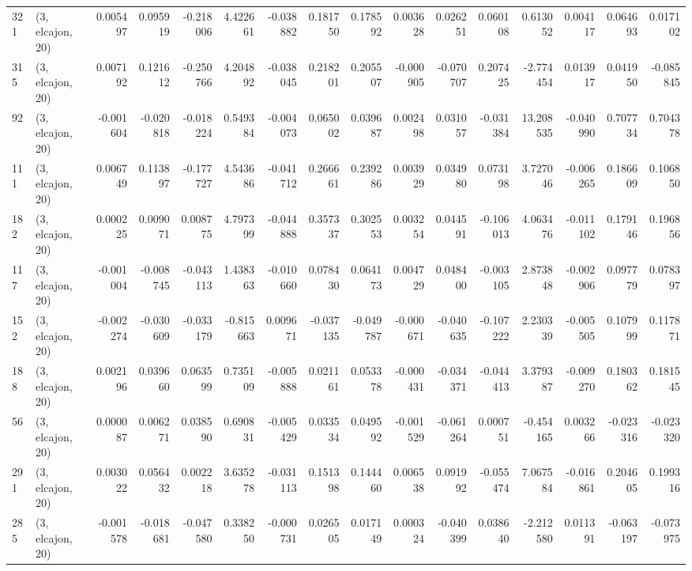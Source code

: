 \begin{tabular}{llrrrrrrrrrrrrrr}
321 &  (3, elcajon, 20) &   0.005497 &  0.095919 & -0.218006 &    4.422661 & -0.038882 &   0.181750 &  0.178592 &  0.003628 &  0.026251 &  0.060108 &    0.613052 &  0.004117 &  0.064693 &  0.017102 \\
315 &  (3, elcajon, 20) &   0.007192 &  0.121612 & -0.250766 &    4.204892 & -0.038045 &   0.218201 &  0.205507 & -0.000905 & -0.070707 &  0.207425 &   -2.774454 &  0.013917 &  0.041950 & -0.085845 \\
92  &  (3, elcajon, 20) &  -0.001604 & -0.020818 & -0.018224 &    0.549384 & -0.004073 &   0.065002 &  0.039687 &  0.002498 &  0.031057 & -0.031384 &   13.208535 & -0.040990 &  0.707734 &  0.704378 \\
111 &  (3, elcajon, 20) &   0.006749 &  0.113897 & -0.177727 &    4.543686 & -0.041712 &   0.266661 &  0.239286 &  0.003929 &  0.034980 &  0.073198 &    3.727046 & -0.006265 &  0.186609 &  0.106850 \\
182 &  (3, elcajon, 20) &   0.000225 &  0.009071 &  0.008775 &    4.797399 & -0.044888 &   0.357337 &  0.302553 &  0.003254 &  0.044591 & -0.106013 &    4.063476 & -0.011102 &  0.179146 &  0.196856 \\
117 &  (3, elcajon, 20) &  -0.001004 & -0.008745 & -0.043113 &    1.438363 & -0.010660 &   0.078430 &  0.064173 &  0.004729 &  0.048400 & -0.003105 &    2.873848 & -0.002906 &  0.097779 &  0.078397 \\
152 &  (3, elcajon, 20) &  -0.002274 & -0.030609 & -0.033179 &   -0.815663 &  0.009671 &  -0.037135 & -0.049787 & -0.000671 & -0.040635 & -0.107222 &    2.230339 & -0.005505 &  0.107999 &  0.117871 \\
188 &  (3, elcajon, 20) &   0.002196 &  0.039660 &  0.063599 &    0.735109 & -0.005888 &   0.021161 &  0.053378 & -0.000431 & -0.034371 & -0.044413 &    3.379387 & -0.009270 &  0.180362 &  0.181545 \\
56  &  (3, elcajon, 20) &   0.000087 &  0.006271 &  0.038590 &    0.690831 & -0.005429 &   0.033534 &  0.049592 & -0.001529 & -0.061264 &  0.000751 &   -0.454165 &  0.003266 & -0.023316 & -0.023320 \\
291 &  (3, elcajon, 20) &   0.003022 &  0.056432 &  0.002218 &    3.635278 & -0.031113 &   0.151398 &  0.144460 &  0.006538 &  0.091992 & -0.055474 &    7.067584 & -0.016861 &  0.204605 &  0.199316 \\
285 &  (3, elcajon, 20) &  -0.001578 & -0.018681 & -0.047580 &    0.338250 & -0.000731 &   0.026505 &  0.017149 &  0.000324 & -0.040399 &  0.038640 &   -2.212580 &  0.011391 & -0.063197 & -0.073975 \\

\end{tabular}
